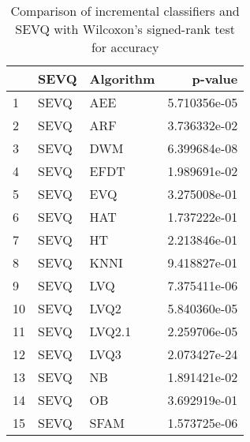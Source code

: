\begin{table}[H]
\footnotesize
\centering
\caption{Comparison of incremental classifiers and SEVQ with Wilcoxon’s signed-rank test for accuracy}
\label{tab:Incremental wilcoxon ACC comparison}
\begin{tabular}{lllr}
\hline
{} &  SEVQ & Algorithm &       p-value \\
\hline
1  &  SEVQ &       AEE &  5.710356e-05 \\
2  &  SEVQ &       ARF &  3.736332e-02 \\
3  &  SEVQ &       DWM &  6.399684e-08 \\
4  &  SEVQ &      EFDT &  1.989691e-02 \\
5  &  SEVQ &       EVQ &  3.275008e-01 \\
6  &  SEVQ &       HAT &  1.737222e-01 \\
7  &  SEVQ &        HT &  2.213846e-01 \\
8  &  SEVQ &      KNNI &  9.418827e-01 \\
9  &  SEVQ &       LVQ &  7.375411e-06 \\
10 &  SEVQ &      LVQ2 &  5.840360e-05 \\
11 &  SEVQ &    LVQ2.1 &  2.259706e-05 \\
12 &  SEVQ &      LVQ3 &  2.073427e-24 \\
13 &  SEVQ &        NB &  1.891421e-02 \\
14 &  SEVQ &        OB &  3.692919e-01 \\
15 &  SEVQ &      SFAM &  1.573725e-06 \\
\hline
\end{tabular}
\end{table}
